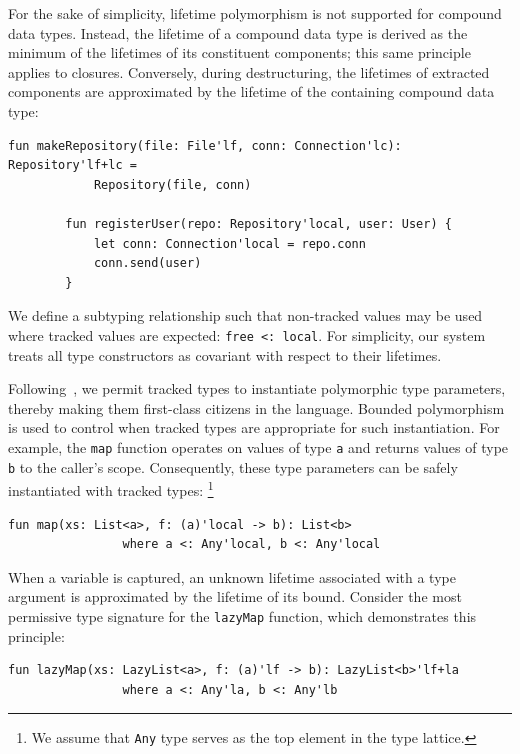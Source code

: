 \documentclass[11pt]{article}
\begin{document}
    For the sake of simplicity, lifetime polymorphism is not supported for compound data types.
    Instead, the lifetime of a compound data type is derived as the minimum of the lifetimes of its constituent components; this same principle applies to closures.
    Conversely, during destructuring, the lifetimes of extracted components are approximated by the lifetime of the containing compound data type:
    \begin{lstlisting}[language=colang]
        fun makeRepository(file: File'lf, conn: Connection'lc): Repository'lf+lc =
            Repository(file, conn)

        fun registerUser(repo: Repository'local, user: User) {
            let conn: Connection'local = repo.conn
            conn.send(user)
        }
    \end{lstlisting}

    We define a subtyping relationship such that non-tracked values may be used where tracked values are expected: \lstinline[language=colang]|free <: local|.
    For simplicity, our system treats all type constructors as covariant with respect to their lifetimes.

    Following~\cite{boruch2023capturing}, we permit tracked types to instantiate polymorphic type parameters, thereby making them first-class citizens in the language.
    Bounded polymorphism is used to control when tracked types are appropriate for such instantiation.
    For example, the \lstinline[language=colang]|map| function operates on values of type \lstinline[language=colang]|a| and returns values of type \lstinline[language=colang]|b| to the caller's scope.
    Consequently, these type parameters can be safely instantiated with tracked types:%
    \footnote{We assume that \lstinline[language=colang]|Any| type serves as the top element in the type lattice.}
    \begin{lstlisting}[language=colang]
        fun map(xs: List<a>, f: (a)'local -> b): List<b>
                where a <: Any'local, b <: Any'local
    \end{lstlisting}

    When a variable is captured, an unknown lifetime associated with a type argument is approximated by the lifetime of its bound.
    Consider the most permissive type signature for the \lstinline[language=colang]|lazyMap| function, which demonstrates this principle:
    \begin{lstlisting}[language=colang]
        fun lazyMap(xs: LazyList<a>, f: (a)'lf -> b): LazyList<b>'lf+la
                where a <: Any'la, b <: Any'lb
    \end{lstlisting}
\end{document}
